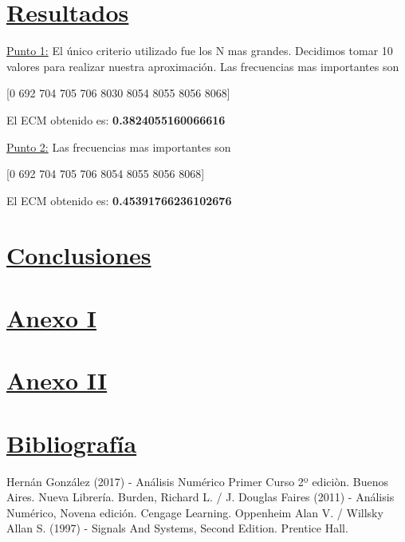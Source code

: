 \documentclass[10pt,a4paper]{article}
\numberwithin{equation}{section}
\numberwithin{figure}{section}
\numberwithin{table}{section}
\begin{document}
    
\section{\underline{Resultados}}
\underline{Punto 1:}
El único criterio utilizado fue los N mas grandes.
Decidimos tomar 10 valores para realizar nuestra aproximación. Las frecuencias mas importantes son

\begin{center}
    [0  692  704  705  706 8030 8054 8055 8056 8068]
\end{center}

El ECM obtenido es: \textbf{0.3824055160066616}


\underline{Punto 2:}
Las frecuencias mas importantes son
\begin{center}
    [0  692  704  705  706 8054 8055 8056 8068]
\end{center}

El ECM obtenido es: \textbf{0.45391766236102676}


\section{\underline{Conclusiones}}

\section{\underline{Anexo I}}

\section{\underline{Anexo II}}


\section{\underline{Bibliografía}}
\begin{thebibliography}{9}

Hernán González (2017) - Análisis Numérico Primer Curso 2º ediciòn. Buenos Aires. Nueva Librería. 
Burden, Richard L. / J. Douglas Faires (2011) - Análisis Numérico, Novena edición. Cengage Learning.
Oppenheim Alan V. / Willsky Allan S. (1997) - Signals And Systems, Second Edition. Prentice Hall.
\end{thebibliography}
\end{document}
